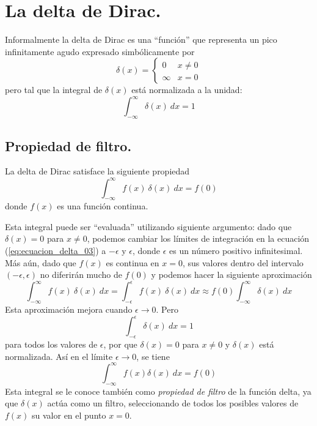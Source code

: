 \section{La delta de Dirac.}
Informalmente la delta de Dirac es una \enquote{función} que representa un pico infinitamente agudo expresado simbólicamente por
\begin{equation}
\delta (x) = \begin{cases}
0 & x \neq 0 \\
\infty & x = 0
\end{cases}
\label{eq:ecuacion_delta_01}
\end{equation}
pero tal que la integral de $\delta (x)$ está normalizada a la unidad:
\begin{equation}
\int_{-\infty}^{\infty} \delta (x) \: dx = 1 
\label{eq:ecuacion_delta_02}
\end{equation}
\subsection{Propiedad de filtro.}
La delta de Dirac satisface la siguiente propiedad
\begin{equation}
\int_{-\infty}^{\infty} f(x) \: \delta (x) \: dx = f(0)
\label{eq:ecuacion_delta_03}
\end{equation}
donde $f(x)$ es una función continua.
\par
Esta integral puede ser \enquote{evaluada} utilizando siguiente argumento: dado que $\delta (x) = 0$
para $x \neq 0$, podemos cambiar los límites de integración en la ecuación (\ref{eq:ecuacion_delta_03}) a $- \epsilon$ y $\epsilon$, donde $\epsilon$ es un número positivo infinitesimal. Más aún, dado que $f(x)$ es continua en $x = 0$, sus valores dentro del intervalo $( - \epsilon, \epsilon)$ no diferirán mucho de $f(0)$ y podemos hacer la siguiente aproximación
\[ \int_{-\infty}^{\infty} f(x) \: \delta (x) \: dx = \int_{-\epsilon}^{\epsilon} f(x) \: \delta (x) \: dx \approx f(0) \int_{-\infty}^{\infty} \delta (x) \: dx  \]
Esta aproximación mejora cuando $\epsilon \to 0$. Pero
\[ \int_{-\epsilon}^{\epsilon} \delta (x) \: dx = 1 \]
para todos los valores de $\epsilon$, por que $\delta (x) = 0$ para $x \neq 0$ y $\delta (x)$ está normalizada. Así en el límite $\epsilon \to 0$, se tiene
\[\int_{-\infty}^{\infty} f(x) \delta (x) \: dx = f(0)  \]
Esta integral se le conoce también como \emph{propiedad de filtro} de la función delta, ya que $\delta (x)$ actúa como un filtro, seleccionando de todos los posibles valores de $f(x)$ su valor en el punto $x=0$.
